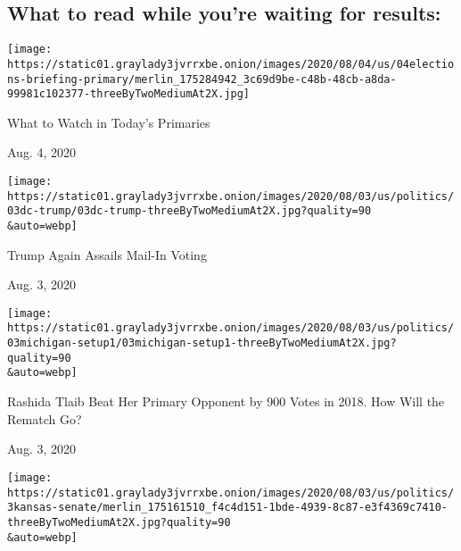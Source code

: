 \hypertarget{what-to-read-while-youre-waiting-for-results}{%
\subsection{What to read while you're waiting for
results:}\label{what-to-read-while-youre-waiting-for-results}}

\href{https://www.nytimes3xbfgragh.onion/2020/08/04/us/elections/primary-election-michigan-arizona-kansas.html?action=click\&module=ELEX_results\&pgtype=Interactive\&region=RelatedCoverage}{}

\texttt{[image: https://static01.graylady3jvrrxbe.onion/images/2020/08/04/us/04elections-briefing-primary/merlin\_175284942\_3c69d9be-c48b-48cb-a8da-99981c102377-threeByTwoMediumAt2X.jpg]}

What to Watch in Today's Primaries

Aug. 4, 2020

\href{https://www.nytimes3xbfgragh.onion/2020/08/03/us/politics/trump-mail-in-voting.html?action=click\&module=ELEX_results\&pgtype=Interactive\&region=RelatedCoverage}{}

\texttt{[image: https://static01.graylady3jvrrxbe.onion/images/2020/08/03/us/politics/03dc-trump/03dc-trump-threeByTwoMediumAt2X.jpg?quality=90\\\&auto=webp]}

Trump Again Assails Mail-In Voting

Aug. 3, 2020

\href{https://www.nytimes3xbfgragh.onion/2020/08/03/us/politics/michigan-primary-rashida-tlaib-brenda-jones.html?action=click\&module=ELEX_results\&pgtype=Interactive\&region=RelatedCoverage}{}

\texttt{[image: https://static01.graylady3jvrrxbe.onion/images/2020/08/03/us/politics/03michigan-setup1/03michigan-setup1-threeByTwoMediumAt2X.jpg?quality=90\\\&auto=webp]}

Rashida Tlaib Beat Her Primary Opponent by 900 Votes in 2018. How Will
the Rematch Go?

Aug. 3, 2020

\href{https://www.nytimes3xbfgragh.onion/2020/08/03/us/politics/kris-kobach-kansas-senate-primary.html?action=click\&module=ELEX_results\&pgtype=Interactive\&region=RelatedCoverage}{}

\texttt{[image: https://static01.graylady3jvrrxbe.onion/images/2020/08/03/us/politics/3kansas-senate/merlin\_175161510\_f4c4d151-1bde-4939-8c87-e3f4369c7410-threeByTwoMediumAt2X.jpg?quality=90\\\&auto=webp]}

